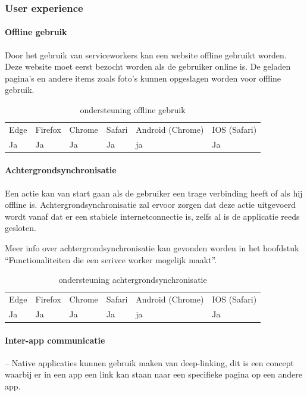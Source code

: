 \subsubsection{User experience}

\paragraph{Offline gebruik}
Door het gebruik van serviceworkers kan een website offline gebruikt worden. Deze website moet eerst bezocht worden als de gebruiker online is. De geladen pagina’s en andere items zoals foto’s kunnen opgeslagen worden voor offline gebruik.

\begin{table}[H]
	\begin{tabular}{llllll}
		Edge & Firefox & Chrome & Safari & Android (Chrome) & IOS (Safari) \\
		Ja   & Ja      &  Ja     & Ja     & ja               & Ja          
	\end{tabular}	
	\caption{ondersteuning offline gebruik}
	\label{ondersteuning offline gebruik}
\end{table}	



\paragraph{Achtergrondsynchronisatie }

Een actie kan van start gaan als de gebruiker een trage verbinding heeft of als hij offline is. Achtergrondsynchronisatie zal ervoor zorgen dat deze actie uitgevoerd wordt vanaf dat er een stabiele internetconnectie is, zelfs al is de applicatie reeds gesloten.

Meer info over achtergrondsynchronisatie kan gevonden worden in het hoofdstuk “Functionaliteiten die een serivce worker mogelijk maakt”.


\begin{table}[H]
	\centering
	\begin{tabular}{llllll}
		Edge & Firefox & Chrome & Safari & Android (Chrome) & IOS (Safari) \\
		Ja   & Ja      &  Ja     & Ja     & ja               & Ja          
	\end{tabular}	
	\caption{ondersteuning achtergrondsynchronisatie}
	\label{ondersteuning achtergrondsynchronisatie}
\end{table}


\paragraph{Inter-app communicatie}
– Native applicaties kunnen gebruik maken van deep-linking, dit is een concept waarbij er in een app een link kan staan naar een specifieke pagina op een andere app.


